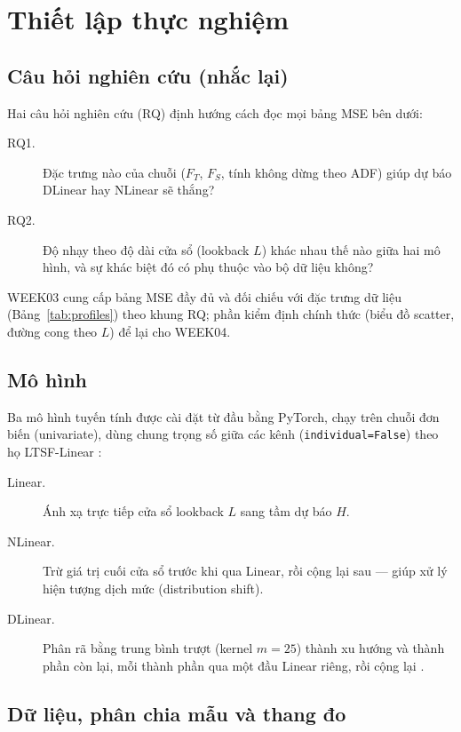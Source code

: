 \section{Thiết lập thực nghiệm}
\label{sec:setup}

\subsection{Câu hỏi nghiên cứu (nhắc lại)}

Hai câu hỏi nghiên cứu (RQ) định hướng cách đọc mọi bảng MSE bên dưới:

\begin{description}
  \item[RQ1.] Đặc trưng nào của chuỗi (\(F_T\), \(F_S\), tính không dừng theo ADF)
        giúp dự báo DLinear hay NLinear sẽ thắng?
  \item[RQ2.] Độ nhạy theo độ dài cửa sổ (lookback \(L\)) khác nhau thế nào giữa hai mô hình,
        và sự khác biệt đó có phụ thuộc vào bộ dữ liệu không?
\end{description}

WEEK03 cung cấp bảng MSE đầy đủ và đối chiếu với đặc trưng dữ liệu
(Bảng~\ref{tab:profiles}) theo khung RQ; phần kiểm định chính thức
(biểu đồ scatter, đường cong theo \(L\)) để lại cho WEEK04.

\subsection{Mô hình}

Ba mô hình tuyến tính được cài đặt từ đầu bằng PyTorch, chạy trên chuỗi đơn biến (univariate),
dùng chung trọng số giữa các kênh (\texttt{individual=False})
theo họ LTSF-Linear \cite{zeng2023ltsf}:

\begin{description}
  \item[Linear.] Ánh xạ trực tiếp cửa sổ lookback \(L\) sang tầm dự báo \(H\).
  \item[NLinear.] Trừ giá trị cuối cửa sổ trước khi qua Linear, rồi cộng lại sau
        --- giúp xử lý hiện tượng dịch mức (distribution shift).
  \item[DLinear.] Phân rã bằng trung bình trượt (kernel \(m=25\)) thành xu hướng và thành phần còn lại,
        mỗi thành phần qua một đầu Linear riêng, rồi cộng lại \cite{wu2021autoformer,zeng2023ltsf}.
\end{description}

\subsection{Dữ liệu, phân chia mẫu và thang đo}

